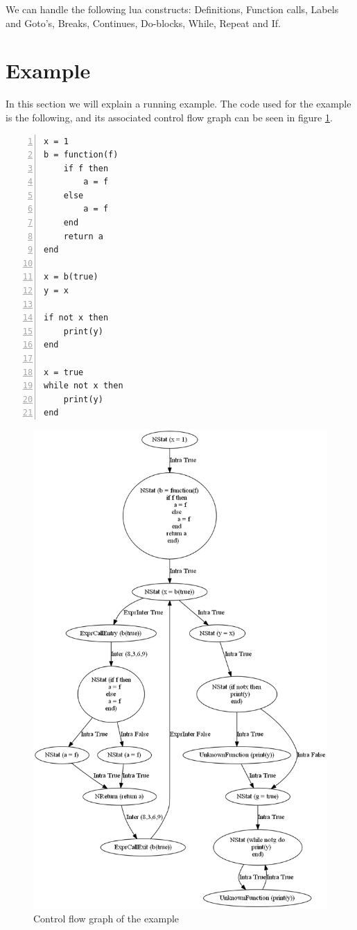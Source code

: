 \documentclass[10pt]{article}
\begin{document}
We can handle the following lua constructs: Definitions, Function calls, Labels and Goto's, Breaks, Continues, Do-blocks, While, Repeat and If.


\section{Example}
In this section we will explain a running example. The code used for the example is the following, and its associated control flow graph can be seen in figure \ref{fig:cfg}.

\begin{lstlisting}[frame=single,numbers=left,caption=Simple example] % lstlisting kent geen Lua, dus maar geen syntax highlighting
x = 1
b = function(f)
    if f then
        a = f
    else
        a = f
    end
    return a
end

x = b(true)
y = x

if not x then
    print(y)
end

x = true
while not x then
    print(y)
end
\end{lstlisting}

\begin{figure}[htp]
    \includegraphics[scale=0.45]{utTesta.png}
    \caption{Control flow graph of the example}
    \label{fig:cfg}
\end{figure}
\end{document}
